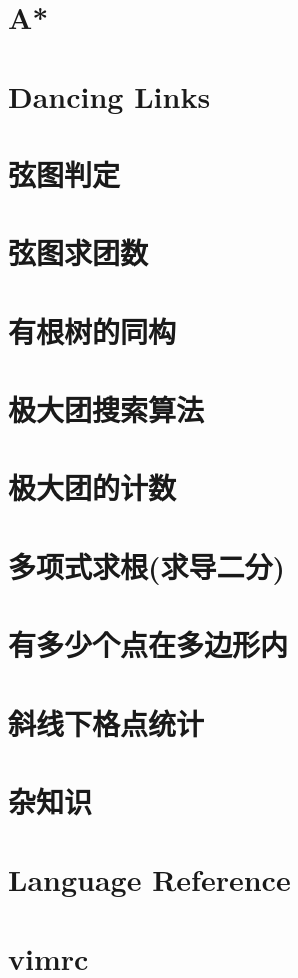 \documentclass[a4paper,10pt]{book}
\begin{document}
	\section{A*}
		

	\section{Dancing Links}
		

	\section{弦图判定}
		
	
	\section{弦图求团数}
		

	\section{有根树的同构}
		
	
	\section{极大团搜索算法}
		
	
	\section{极大团的计数}
		
	
	\section{多项式求根(求导二分)}
		
	
	\section{有多少个点在多边形内}
		
	
	\section{斜线下格点统计}
		

	\section{杂知识}
	    

	\section{Language Reference}
	    

	\section{vimrc}
		
\end{document}
